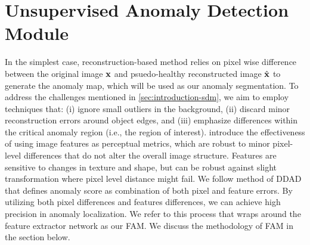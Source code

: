 \section{Unsupervised Anomaly Detection Module}
\label{sec:fam}


In the simplest case, reconstruction-based method relies on pixel wise difference between the original image ${\mathbf{x}}$ and psuedo-healthy reconstructed image $\hat{{\mathbf{x}}}$ to generate the anomaly map, which will be used as our anomaly segmentation. To address the challenges mentioned in \cref{sec:introduction-sdm}, we aim to employ techniques that: (i) ignore small outliers in the background, (ii) discard minor reconstruction errors around object edges, and (iii) emphasize differences within the critical anomaly region (i.e., the region of interest). \cite{zhang2018unreasonableeffectivenessdeepfeatures} introduce the effectiveness of using image features as perceptual metrics, which are robust to minor pixel-level differences that do not alter the overall image structure. Features are sensitive to changes in texture and shape, but can be robust against slight transformation where pixel level distance might fail. We follow method of DDAD \cite{DDAD} that defines anomaly score as combination of both pixel and feature errors. By utilizing both pixel differences and features differences, we can achieve high precision in anomaly localization. We refer to this process that wraps around the feature extractor network as our \ac{FAM}. We discuss the methodology of \ac{FAM} in the section below. 



